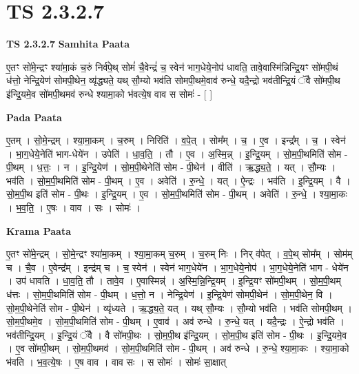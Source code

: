 \documentclass[17pt]{extarticle}
\begin{document}
\section*{ TS 2.3.2.7 }

\textbf{TS 2.3.2.7 } \newline
\textbf{Samhita Paata} \newline

ए॒तꣳ सो॑मे॒न्द्रꣳ श्या॑मा॒कं च॒रुं निर्व॑पे॒थ् सोमं॑ चै॒वेन्द्रं॑ च॒ स्वेन॑ भाग॒धेये॒नोप॑ धावति॒ तावे॒वास्मि॑न्निन्द्रि॒यꣳ सो॑मपी॒थं ध॑त्तो॒ नेन्द्रि॒येण॑ सोमपी॒थेन॒ व्यृ॑द्ध्यते॒ यथ् सौ॒म्यो भव॑ति सोमपी॒थमे॒वाव॑ रुन्धे॒ यदै॒न्द्रो भव॑तीन्द्रि॒यं ॅवै सो॑मपी॒थ इ॑न्द्रि॒यमे॒व सो॑मपी॒थमव॑ रुन्धे श्यामा॒को भ॑वत्ये॒ष वाव स सोमः॑ - [  ] \newline

\textbf{Pada Paata} \newline

ए॒तम् । सो॒मे॒न्द्रम् । श्या॒मा॒कम् । च॒रुम् । निरिति॑ । व॒पे॒त् । सोम᳚म् । च॒ । ए॒व । इन्द्र᳚म् । च॒ । स्वेन॑ । भा॒ग॒धेये॒नेति॑ भाग-धेये॑न । उपेति॑ । धा॒व॒ति॒ । तौ । ए॒व । अ॒स्मि॒न्न् । इ॒न्द्रि॒यम् । सो॒म॒पी॒थमिति॑ सोम - पी॒थम् । ध॒त्तः॒ । न । इ॒न्द्रि॒येण॑ । सो॒म॒पी॒थेनेति॑ सोम - पी॒थेन॑ । वीति॑ । ऋ॒द्ध्य॒ते॒ । यत् । सौ॒म्यः । भव॑ति । सो॒म॒पी॒थमिति॑ सोम - पी॒थम् । ए॒व । अवेति॑ । रु॒न्धे॒ । यत् । ऐ॒न्द्रः । भव॑ति । इ॒न्द्रि॒यम् । वै । सो॒म॒पी॒थ इति॑ सोम - पी॒थः । इ॒न्द्रि॒यम् । ए॒व । सो॒म॒पी॒थमिति॑ सोम - पी॒थम् । अवेति॑ । रु॒न्धे॒ । श्या॒मा॒कः । भ॒व॒ति॒ । ए॒षः । वाव । सः । सोमः॑ ।  \newline


\textbf{Krama Paata} \newline

ए॒तꣳ सो॑मे॒न्द्रम् । सो॒मे॒न्द्रꣳ श्या॑मा॒कम् । श्या॒मा॒कम् च॒रुम् । च॒रुम् निः । निर् व॑पेत् । व॒पे॒थ् सोम᳚म् । सोम॑म् च । चै॒व । ए॒वेन्द्र᳚म् । इन्द्र॑म् च । च॒ स्वेन॑ । स्वेन॑ भाग॒धेये॑न । भा॒ग॒धेये॒नोप॑ । भा॒ग॒धेये॒नेति॑ भाग - धेये॑न । उप॑ धावति । धा॒व॒ति॒ तौ । तावे॒व । ए॒वास्मिन्न्॑ । अ॒स्मि॒न्नि॒न्द्रि॒यम् । इ॒न्द्रि॒यꣳ सो॑मपी॒थम् । सो॒म॒पी॒थम् ध॑त्तः । सो॒म॒पी॒थमिति॑ सोम - पी॒थम् । ध॒त्तो॒ न । नेन्द्रि॒येण॑ । इ॒न्द्रि॒येण॑ सोमपी॒थेन॑ । सो॒म॒पी॒थेन॒ वि । सो॒म॒पी॒थेनेति॑ सोम - पी॒थेन॑ । व्यृ॑ध्यते । ऋ॒द्ध्य॒ते॒ यत् । यथ् सौ॒म्यः । सौ॒म्यो भव॑ति । भव॑ति सोमपी॒थम् । सो॒म॒पी॒थमे॒व । सो॒म॒पी॒थमिति॑ सोम - पी॒थम् । ए॒वाव॑ । अव॑ रुन्धे । रु॒न्धे॒ यत् । यदै॒न्द्रः । ऐ॒न्द्रो भव॑ति । भव॑तीन्द्रि॒यम् । इ॒न्द्रि॒यं ॅवै । वै सो॑मपी॒थः । सो॒म॒पी॒थ इ॑न्द्रि॒यम् । सो॒म॒पी॒थ इति॑ सोम - पी॒थः । इ॒न्द्रि॒यमे॒व । ए॒व सो॑मपी॒थम् । सो॒म॒पी॒थमव॑ । सो॒म॒पी॒थमिति॑ सोम - पी॒थम् । अव॑ रुन्धे । रु॒न्धे॒ श्या॒मा॒कः । श्या॒मा॒को भ॑वति । भ॒व॒त्ये॒षः । ए॒ष वाव । वाव सः । स सोमः॑ । सोमः॑ सा॒क्षात् \newline
\end{document}
